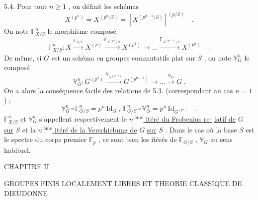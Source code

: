 \documentclass[11pt]{article}
\newcommand{\scanpage}[1]{\par\bigskip\noindent{\small\sffamily[scan #1]}\par}
\newcommand{\mspage}[1]{{\small\sffamily[p.\,#1]}}
\newcommand{\hand}[1]{\textcolor{blue}{#1}}
\newcommand{\uline}[1]{\underline{#1}}
\begin{document}
\mspage{26}

\clearpage
\scanpage{129/27}
5.4. \quad Pour tout $n \geq 1$ , on définit les schémas
\[ X^{(p^{n})} = X^{(p^{n}/S)} = [X^{(p^{n-1}/S)}]^{(p/S)} \quad . \]
On note $\mathbb{F}^{n}_{X/S}$ le morphisme composé
\[ \mathbb{F}^{n}_{X/S} : X \xrightarrow{\mathbb{F}_{X/S}} X^{(p)} \xrightarrow{\mathbb{F}_{X^{(p)}/S}} X^{(p^{2})} \to \dots \xrightarrow{\mathbb{F}_{X^{(p^{n-1})}/S}} X^{(p^{n})} \quad . \]
De même, si $G$ est un schéma en groupes commutatifs plat sur $S$ , on
note $\mathbb{V}^{n}_{G}$ le composé
\[ \mathbb{V}^{n}_{G} : G^{(p^{n})} \xrightarrow{\mathbb{V}_{G^{(p^{n-1})}}} G^{(p^{n-1})} \to \dots \xrightarrow{\mathbb{V}_{G}} G \ . \]
On a alors la conséquence facile des relations de 5.3. (correspondant
au cas $n = 1$) :
\[ \mathbb{V}^{n}_{G} \circ \mathbb{F}^{n}_{G/S} = p^{n}\,\mathrm{Id}_{G} \ , \ \mathbb{F}^{n}_{G/S} \circ \mathbb{V}^{n}_{G} = p^{n}\,\mathrm{Id}_{G^{(p^{n})}} \quad . \]
$\mathbb{F}^{n}_{X/S}$ et $\mathbb{V}^{n}_{G}$ s'appellent respectivement le \uline{$n^{\text{ième}}$ itéré du Frobenius re-}%
\uline{latif de} $G$ \uline{sur} $S$ et la \uline{$n^{\text{ième}}$ itéré de la Verschiebung de} $G$ \uline{sur} $S$ .
Dans le cas où la base $S$ est le spectre du corps premier $\mathbb{F}_{p}$ , ce sont
bien les itérés de $\mathbb{F}_{G/S}$ , $\mathbb{V}_{G}$ au sens habituel.

\mspage{\hand{27}}

\clearpage
\scanpage{129/28}
CHAPITRE II

GROUPES FINIS LOCALEMENT LIBRES ET THEORIE CLASSIQUE DE DIEUDONNE

\mspage{\hand{28}}

\clearpage
\scanpage{129/29}
\mspage{\hand{II.1}}
\end{document}
